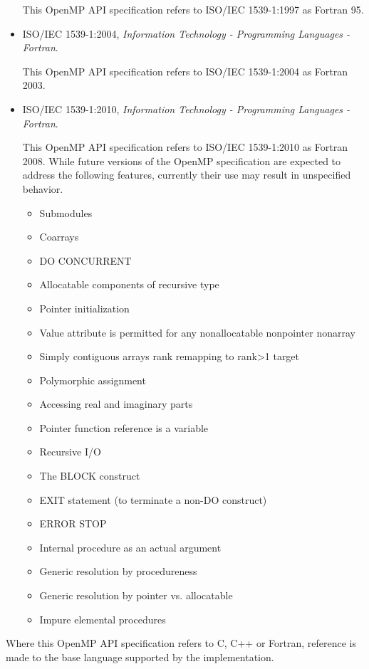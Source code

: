 \begin{itemize}
This OpenMP API specification refers to ISO/IEC 1539-1:1997 as Fortran 95.

\item ISO/IEC 1539-1:2004, \textsl{Information Technology - Programming Languages - Fortran}.

This OpenMP API specification refers to ISO/IEC 1539-1:2004 as Fortran 2003.

\item ISO/IEC 1539-1:2010, \textsl{Information Technology - Programming Languages - Fortran}.

This OpenMP API specification refers to ISO/IEC 1539-1:2010 as Fortran 2008. 
While future versions of the OpenMP specification are expected to
address the following features, currently their use may result in
unspecified behavior.

\begin{itemize}
\item Submodules
\item Coarrays
\item DO CONCURRENT
\item Allocatable components of recursive type
\item Pointer initialization
\item Value attribute is permitted for any nonallocatable nonpointer nonarray
\item Simply contiguous arrays rank remapping to rank>1 target
\item Polymorphic assignment
\item Accessing real and imaginary parts
\item Pointer function reference is a variable
\item Recursive I/O
\item The BLOCK construct
\item EXIT statement (to terminate a non-DO construct)
\item ERROR STOP
\item Internal procedure as an actual argument
\item Generic resolution by procedureness
\item Generic resolution by pointer vs. allocatable
\item Impure elemental procedures
\end{itemize}

\end{itemize}

Where this OpenMP API specification refers to C, C++ or Fortran, reference is made to
the base language supported by the implementation.

